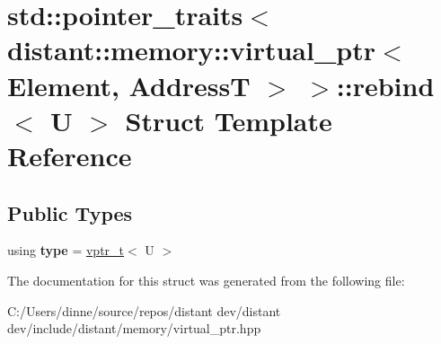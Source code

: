 \hypertarget{structstd_1_1pointer__traits_3_01distant_1_1memory_1_1virtual__ptr_3_01_element_00_01_address_t_01_4_01_4_1_1rebind}{}\section{std\+:\+:pointer\+\_\+traits$<$ distant\+:\+:memory\+:\+:virtual\+\_\+ptr$<$ Element, AddressT $>$ $>$\+:\+:rebind$<$ U $>$ Struct Template Reference}
\label{structstd_1_1pointer__traits_3_01distant_1_1memory_1_1virtual__ptr_3_01_element_00_01_address_t_01_4_01_4_1_1rebind}
\subsection*{Public Types}
\begin{DoxyCompactItemize}
\item 
\mbox{\label{structstd_1_1pointer__traits_3_01distant_1_1memory_1_1virtual__ptr_3_01_element_00_01_address_t_01_4_01_4_1_1rebind_a688f1640405f348734bd8b61d7f12076}} 
using {\bfseries type} = \mbox{\hyperlink{classdistant_1_1memory_1_1virtual__ptr}{vptr\+\_\+t}}$<$ U $>$
\end{DoxyCompactItemize}


The documentation for this struct was generated from the following file\+:\begin{DoxyCompactItemize}
\item 
C\+:/\+Users/dinne/source/repos/distant dev/distant dev/include/distant/memory/virtual\+\_\+ptr.\+hpp\end{DoxyCompactItemize}
